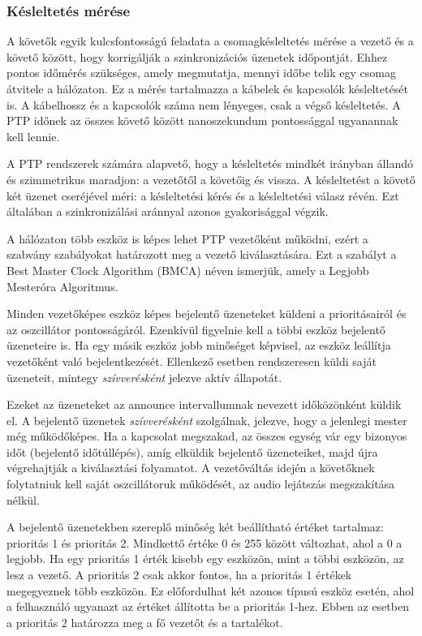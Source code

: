 \subsubsection{Késleltetés mérése}
A követők egyik kulcsfontosságú feladata a csomagkésleltetés mérése a vezető
és a követő között, hogy korrigálják a szinkronizációs üzenetek időpontját.
Ehhez pontos időmérés szükséges, amely megmutatja, mennyi időbe telik egy
csomag átvitele a hálózaton. Ez a mérés tartalmazza a kábelek és kapcsolók
késleltetését is. A kábelhossz és a kapcsolók száma nem lényeges, csak a
végső késleltetés. A PTP időnek az összes követő között nanoszekundum pontossággal
ugyanannak kell lennie.

A PTP rendszerek számára alapvető, hogy a késleltetés mindkét irányban
állandó és szimmetrikus maradjon: a vezetőtől a követőig és vissza.
A késleltetést a követő két üzenet cseréjével méri: a késleltetési kérés
és a késleltetési válasz révén. Ezt általában a szinkronizálási aránnyal
azonos gyakorisággal végzik.

A hálózaton több eszköz is képes lehet PTP vezetőként működni, ezért a
szabvány szabályokat határozott meg a vezető kiválasztására. Ezt a
szabályt a Best Master Clock Algorithm (BMCA) néven ismerjük, amely
a Legjobb Mesteróra Algoritmus.

Minden vezetőképes eszköz képes bejelentő üzeneteket küldeni
a prioritásairól és az oszcillátor pontosságáról. Ezenkívül figyelnie
kell a többi eszköz bejelentő üzeneteire is. Ha egy másik eszköz
jobb minőséget képvisel, az eszköz leállítja vezetőként való
bejelentkezését. Ellenkező esetben rendszeresen küldi saját
üzeneteit, mintegy \textit{szívverésként} jelezve aktív állapotát.

Ezeket az üzeneteket az announce intervallumnak nevezett időközönként
küldik el. A bejelentő üzenetek \textit{szívverésként} szolgálnak,
jelezve, hogy a jelenlegi mester még működőképes. Ha a kapcsolat
megszakad, az összes egység vár egy bizonyos időt (bejelentő időtúllépés),
amíg elküldik bejelentő üzeneteiket, majd újra végrehajtják a
kiválasztási folyamatot. A vezetőváltás idején a követőknek folytatniuk
kell saját oszcillátoruk működését, az audio lejátszás megszakítása
nélkül.

A bejelentő üzenetekben szereplő minőség két beállítható értéket tartalmaz:
prioritás 1 és prioritás 2. Mindkettő értéke 0 és 255 között változhat,
ahol a 0 a legjobb. Ha egy prioritás 1 érték kisebb egy eszközön,
mint a többi eszközön, az lesz a vezető. A prioritás 2 csak akkor
fontos, ha a prioritás 1 értékek megegyeznek több eszközön. Ez előfordulhat
két azonos típusú eszköz esetén, ahol a felhasználó ugyanazt az értéket
állította be a prioritás 1-hez. Ebben az esetben a prioritás 2 határozza
meg a fő vezetőt és a tartalékot.

